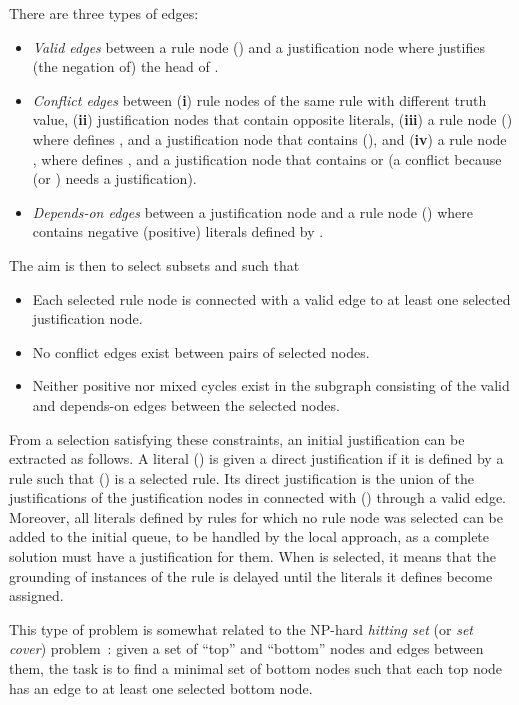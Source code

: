 \documentclass[11pt]{article}
\theoremstyle{plain}
\theoremstyle{definition}
\theoremstyle{example_basic}
\theoremstyle{example_contd}
\theoremstyle{plain}
\newcommand{\tbf}[1]{\textbf{#1}}
\newcommand{\change}[1]{#1}
\begin{document}
\change{There are three types of edges: 
\begin{itemize}
  \item \emph{Valid edges} between a rule node  () and a justification node  where  justifies (the negation of) the head of .
  \item \emph{Conflict edges} between (\tbf{i}) rule nodes of the same
    rule \change{with different truth value}, (\tbf{ii}) justification nodes that contain opposite
    literals, (\tbf{iii}) a rule node  
    () where  defines
    , and a justification node that contains  (), and
    (\tbf{iv}) a rule node , where  defines
    , and a justification node that contains  or  (a
    conflict because  (or ) needs a justification).
  \item \emph{Depends-on edges} between a justification node  and a rule node  () where  contains negative (positive) literals defined by . 
\end{itemize}
The aim is then to select subsets  and  such that
\begin{itemize}
\item Each selected rule node is connected with a valid edge to at least
  one selected justification node.
  \item No conflict edges exist between pairs of selected nodes.
  \item Neither positive nor mixed cycles exist in the subgraph
    consisting of the valid and depends-on edges between the selected nodes. 
\end{itemize}}
\change{From a selection  satisfying these
  constraints, an initial justification \jgraph can be extracted as follows. A
  literal  () is given a direct justification if it is
  defined by a rule  such that 
  () is a selected rule. Its direct justification
  is  the union of the justifications of the justification nodes in
   connected with 
  () through a valid edge. Moreover, all literals
  defined by rules for which no rule node was selected can be added
  to the initial \changes queue, to be handled by the local approach,
  as a complete solution must have a justification for them. When
   is selected, it means that the grounding of instances of the rule is delayed until the literals it defines become assigned.}

This type of problem is somewhat related to the NP-hard \emph{hitting set} (or \emph{set cover}) problem~\cite{Kar72}: given a set of ``top'' and ``bottom'' nodes and edges between them, the task is to find a minimal set of bottom nodes such that each top node has an edge to at least one selected bottom node.
\end{document}
